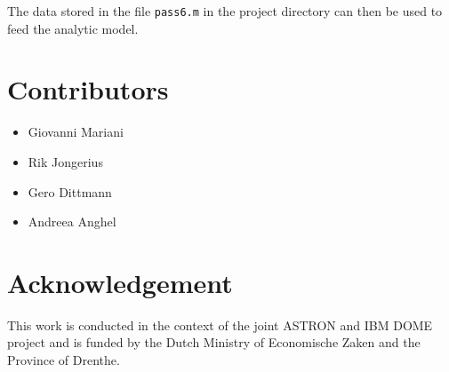 \documentclass[a4paper, 10pt]{article}
\begin{document}
The data stored in the file \texttt{pass6.m} in the \ex project directory can then be used to feed the \eb analytic model.


\section{Contributors}
\label{sec:contributors}
\begin{itemize}
 \item Giovanni Mariani
 \item Rik Jongerius
 \item Gero Dittmann
 \item Andreea Anghel
\end{itemize}

\section{Acknowledgement}
\label{sec:ack}
This work is conducted in the context of the joint
ASTRON and IBM DOME project and is funded by the Dutch Ministry of Economische Zaken and the Province of Drenthe.

\appendix

\newpage
\end{document}
